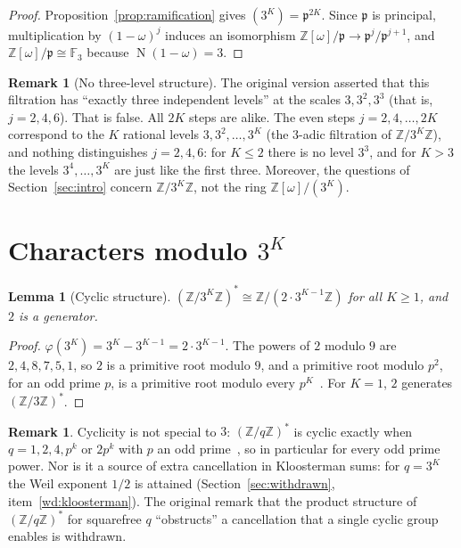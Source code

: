 \documentclass[12pt]{amsart}
\theoremstyle{plain}
\newtheorem{lemma}[theorem]{Lemma}
\theoremstyle{definition}
\newtheorem{remark}[theorem]{Remark}
\newcommand{\Z}{\mathbb{Z}}
\newcommand{\F}{\mathbb{F}}
\newcommand{\Zomega}{\Z[\omega]}
\newcommand{\pp}{\mathfrak{p}}
\DeclareMathOperator{\N}{N}
\begin{document}
\begin{proof}
Proposition~\ref{prop:ramification} gives $(3^K) = \pp^{2K}$. Since $\pp$ is
principal, multiplication by $(1-\omega)^j$ induces an isomorphism
$\Zomega/\pp \to \pp^j/\pp^{j+1}$, and $\Zomega/\pp \cong \F_3$ because
$\N(1-\omega) = 3$.
\end{proof}

\begin{remark}[No three-level structure]
\label{rem:nothree}
The original version asserted that this filtration has ``exactly three
independent levels'' at the scales $3, 3^2, 3^3$ (that is, $j = 2, 4, 6$).
That is false. All $2K$ steps are alike. The even steps $j = 2, 4, \dots, 2K$
correspond to the $K$ rational levels $3, 3^2, \dots, 3^K$ (the $3$-adic
filtration of $\Z/3^K\Z$), and nothing distinguishes $j = 2, 4, 6$: for
$K \leq 2$ there is no level $3^3$, and for $K > 3$ the levels
$3^4, \dots, 3^K$ are just like the first three. Moreover, the questions of
Section~\ref{sec:intro} concern $\Z/3^K\Z$, not the ring $\Zomega/(3^K)$.
\end{remark}

\section{Characters modulo $3^K$}
\label{sec:characters}

\begin{lemma}[Cyclic structure]
\label{lem:cyclic}
$(\Z/3^K\Z)^* \cong \Z/(2 \cdot 3^{K-1}\Z)$ for all $K \geq 1$, and $2$ is a
generator.
\end{lemma}

\begin{proof}
$\varphi(3^K) = 3^K - 3^{K-1} = 2 \cdot 3^{K-1}$. The powers of $2$ modulo
$9$ are $2, 4, 8, 7, 5, 1$, so $2$ is a primitive root modulo $9$, and a
primitive root modulo $p^2$, for an odd prime $p$, is a primitive root modulo
every $p^K$~\cite[Ch.~4]{IrelandRosen1990}. For $K = 1$, $2$ generates
$(\Z/3\Z)^*$.
\end{proof}

\begin{remark}
Cyclicity is not special to $3$: $(\Z/q\Z)^*$ is cyclic exactly when
$q = 1, 2, 4, p^k$ or $2p^k$ with $p$ an odd
prime~\cite[Ch.~4]{IrelandRosen1990}, so in particular for every odd prime
power. Nor is it a source of extra cancellation in Kloosterman sums: for
$q = 3^K$ the Weil exponent $1/2$ is attained (Section~\ref{sec:withdrawn},
item~\ref{wd:kloosterman}). The original remark that the product structure of
$(\Z/q\Z)^*$ for squarefree $q$ ``obstructs'' a cancellation that a single
cyclic group enables is withdrawn.
\end{remark}
\end{document}
